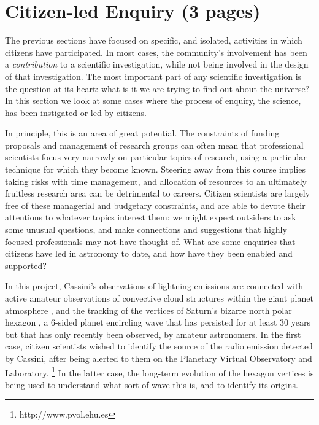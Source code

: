 \documentclass{ar2e}
\begin{document}

\section{Citizen-led Enquiry (3 pages)}
\label{sec:explore}

The previous sections have focused on specific, and isolated, activities in
which citizens have participated. In most cases, the community's involvement has
been a {\it contribution} to a scientific investigation, while not being
involved in the design of that investigation. The most important part of any
scientific investigation is the question at its heart: what is it we are trying
to find out about the universe? In this section we look at some cases where the
process of enquiry, the science, has been instigated or led by citizens.  

In principle, this is an area of great potential. The constraints of funding
proposals and management of research groups can often mean that professional
scientists focus very narrowly on particular topics of research, using a
particular technique for which they become known.  Steering away from this
course implies taking risks with time management, and allocation of resources to
an ultimately fruitless research area can be detrimental to careers.  Citizen
scientists are largely free of these managerial and budgetary constraints, and
are able to devote their attentions to whatever topics interest them: we might
expect outsiders to ask some unusual questions, and make connections and
suggestions that highly focused professionals may not have thought of. What are
some enquiries that citizens have led in astronomy to date, and how have they
been enabled and supported?


  In this project, Cassini's observations of
lightning emissions are connected with active amateur observations of
convective cloud structures within the giant planet atmosphere
\citep{Fischer++2011},  and the tracking of the vertices of Saturn's bizarre
north polar hexagon \citep{godfrey88}, a 6-sided planet encircling wave that
has persisted for at least 30 years but that has only recently been observed,
by amateur astronomers.  In the first case, citizen scientists wished to
identify the source of the radio emission detected by Cassini, after being
alerted to them on the Planetary Virtual  Observatory and Laboratory.
\footnote{http://www.pvol.ehu.es} In the latter case, the long-term evolution
of the hexagon vertices is being used to understand what sort of wave this is,
and to identify its origins.
\end{document}
